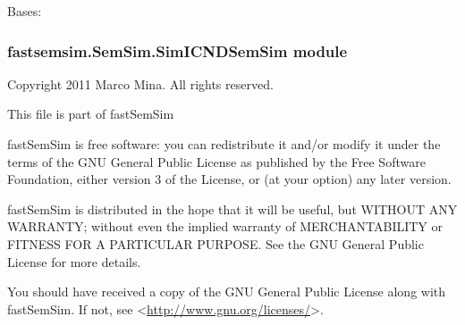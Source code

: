 \documentclass[letterpaper,10pt,english]{sphinxmanual}
\begin{document}
\begin{fulllineitems}
\label{fastsemsim.SemSim:fastsemsim.SemSim.SimGICSemSim.SimGICSemSim}
Bases: {\hyperref[fastsemsim.SemSim:fastsemsim.SemSim.TermSemSim.TermSemSim]{}}

\begin{fulllineitems}
\label{fastsemsim.SemSim:fastsemsim.SemSim.SimGICSemSim.SimGICSemSim.IC_based}
\end{fulllineitems}


\begin{fulllineitems}
\label{fastsemsim.SemSim:fastsemsim.SemSim.SimGICSemSim.SimGICSemSim.SS_type}
\end{fulllineitems}


\end{fulllineitems}



\subsubsection{fastsemsim.SemSim.SimICNDSemSim module}
\label{fastsemsim.SemSim:fastsemsim-semsim-simicndsemsim-module}\label{fastsemsim.SemSim:module-fastsemsim.SemSim.SimICNDSemSim}
Copyright 2011 Marco Mina. All rights reserved.

This file is part of fastSemSim

fastSemSim is free software: you can redistribute it and/or modify
it under the terms of the GNU General Public License as published by
the Free Software Foundation, either version 3 of the License, or
(at your option) any later version.

fastSemSim is distributed in the hope that it will be useful,
but WITHOUT ANY WARRANTY; without even the implied warranty of
MERCHANTABILITY or FITNESS FOR A PARTICULAR PURPOSE.  See the
GNU General Public License for more details.

You should have received a copy of the GNU General Public License
along with fastSemSim.  If not, see \textless{}\href{http://www.gnu.org/licenses/}{http://www.gnu.org/licenses/}\textgreater{}.
\end{document}
